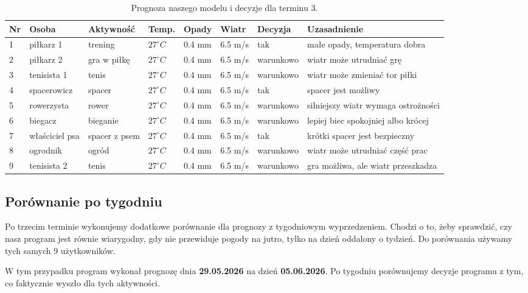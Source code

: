 \documentclass[a4paper,12pt]{article}
\begin{document}
\begin{table}[H]
\centering
\scriptsize
\begin{tabular}{p{0.5cm}p{1.7cm}p{2.0cm}p{1.4cm}p{1.3cm}p{1.2cm}p{1.5cm}p{2.3cm}}
\toprule
\textbf{Nr} & \textbf{Osoba} & \textbf{Aktywność} & \textbf{Temp.} & \textbf{Opady} & \textbf{Wiatr} & \textbf{Decyzja} & \textbf{Uzasadnienie} \\
\midrule
1 & piłkarz 1 & trening & $27^\circ C$ & 0.4 mm & 6.5 m/s & tak & małe opady, temperatura dobra \\[12pt]
2 & piłkarz 2 & gra w piłkę & $27^\circ C$ & 0.4 mm & 6.5 m/s & warunkowo & wiatr może utrudniać grę \\[12pt]
3 & tenisista 1 & tenis & $27^\circ C$ & 0.4 mm & 6.5 m/s & warunkowo & wiatr może zmieniać tor piłki \\[12pt]
4 & spacerowicz & spacer & $27^\circ C$ & 0.4 mm & 6.5 m/s & tak & spacer jest możliwy \\[12pt]
5 & rowerzysta & rower & $27^\circ C$ & 0.4 mm & 6.5 m/s & warunkowo & silniejszy wiatr wymaga ostrożności \\[12pt]
6 & biegacz & bieganie & $27^\circ C$ & 0.4 mm & 6.5 m/s & warunkowo & lepiej biec spokojniej albo krócej \\[12pt]
7 & właściciel psa & spacer z psem & $27^\circ C$ & 0.4 mm & 6.5 m/s & tak & krótki spacer jest bezpieczny \\[12pt]
8 & ogrodnik & ogród & $27^\circ C$ & 0.4 mm & 6.5 m/s & warunkowo & wiatr może utrudniać część prac \\[12pt]
9 & tenisista 2 & tenis & $27^\circ C$ & 0.4 mm & 6.5 m/s & warunkowo & gra możliwa, ale wiatr przeszkadza \\
\bottomrule
\end{tabular}
\caption{Prognoza naszego modelu i decyzje dla terminu 3.}
\end{table}

\subsection{Porównanie po tygodniu}

Po trzecim terminie wykonujemy dodatkowe porównanie dla prognozy z tygodniowym
wyprzedzeniem. Chodzi o to, żeby sprawdzić, czy nasz program jest równie
wiarygodny, gdy nie przewiduje pogody na jutro, tylko na dzień oddalony o tydzień.
Do porównania używamy tych samych 9 użytkowników.

\noindent
W tym przypadku program wykonał prognozę dnia \textbf{29.05.2026} na dzień
\textbf{05.06.2026}. Po tygodniu porównujemy decyzje programu z tym, co
faktycznie wyszło dla tych aktywności.
\end{document}
